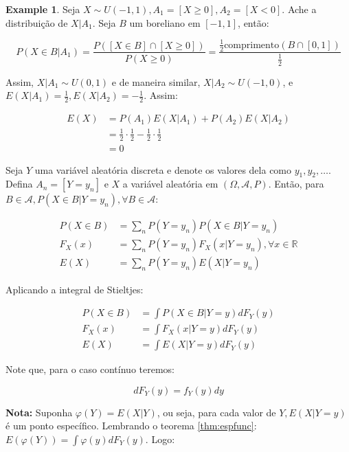 \documentclass[
]{article}
\theoremstyle{definition}
\theoremstyle{definition}
\newtheorem{example}{Example}[section]
\theoremstyle{definition}
\theoremstyle{definition}
\theoremstyle{remark}
\begin{document}
\begin{example}
Seja \(X \sim U(-1,1), A_{1} = [X \ge 0], A_{2} = [X < 0]\). Ache a distribuição de \(X|A_{1}\). Seja \(B\) um boreliano em \([-1,1]\), então:

\begin{equation*}
P(X \in B|A_{1}) = \frac{P([X \in B] \cap [X \ge 0])}{P(X \ge 0)} = \frac{\frac{1}{2}\text{comprimento}(B \cap [0,1])}{\frac{1}{2}}
\end{equation*}

Assim, \(X|A_{1} \sim U(0,1)\) e de maneira similar, \(X|A_{2} \sim U(-1,0)\), e \(E(X|A_{1}) = \frac{1}{2}, E(X|A_{2}) = -\frac{1}{2}\). Assim:

\begin{align*}
E(X) &= P(A_{1})E(X|A_{1}) + P(A_{2})E(X|A_{2}) \\
&= \frac{1}{2}\cdot\frac{1}{2} - \frac{1}{2}\cdot\frac{1}{2} \\
&= 0
\end{align*}
\end{example}

Seja \(Y\) uma variável aleatória discreta e denote os valores dela como \(y_{1},y_{2},\ldots\). Defina \(A_{n} = [Y = y_{n}]\) e \(X\) a variável aleatória em \((\Omega, \mathcal{A}, P)\). Então, para \(B \in \mathcal{A}, P(X \in B|Y = y_{n}),\forall B \in \mathcal{A}\):

\begin{align*}
P(X \in B) &= \sum_{n}P(Y = y_{n})P(X \in B|Y = y_n) \\
F_{X}(x) &= \sum_{n}P(Y = y_{n})F_{X}(x|Y = y_{n}),\forall x \in \mathbb{R} \\
E(X) &= \sum_{n}P(Y = y_{n})E(X|Y = y_{n})
\end{align*}

Aplicando a integral de Stieltjes:

\begin{align*}
P(X \in B) &= \int P(X \in B|Y = y)dF_{Y}(y) \\
F_{X}(x) &= \int F_{X}(x|Y = y)dF_{Y}(y) \\
E(X) &= \int E(X|Y = y)dF_{Y}(y)
\end{align*}

Note que, para o caso contínuo teremos:

\begin{equation*}
dF_{Y}(y) = f_{Y}(y)dy
\end{equation*}

\textbf{Nota:} Suponha \(\varphi(Y) = E(X|Y)\), ou seja, para cada valor de \(Y, E(X|Y = y)\) é um ponto específico. Lembrando o teorema \ref{thm:espfunc}: \(E(\varphi(Y)) = \int \varphi(y)dF_{Y}(y)\). Logo:
\end{document}

